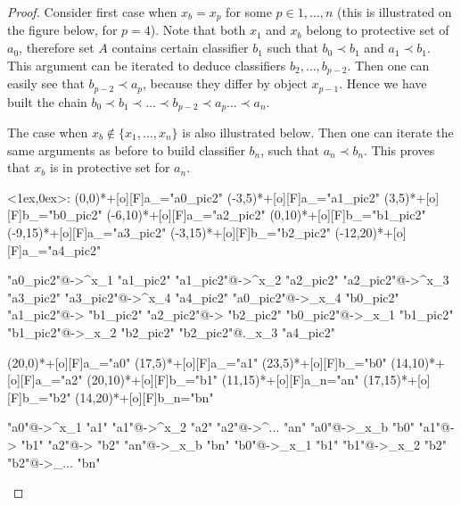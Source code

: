\documentclass{article}
\newenvironment{network}%
    {\begin{xy}<1ex,0ex>:}%
    {\end{xy}}
\def\nnNode[#1](#2)#3{\POS(#2)*#3="#1"}
\def\nnLink[#1,#2]#3{\POS"#1"\ar #3 "#2"}
\begin{document}
\begin{proof}
Consider first case when $x_b = x_p$ for some $p \in 1, \dots, n$ (this is illustrated on the figure below, for $p=4$).
Note that both $x_1$ and $x_b$ belong to protective set of $a_0$, therefore set $A$ contains certain classifier $b_1$ such that $b_0 \prec b_1$ and $a_1 \prec b_1$.
This argument can be iterated to deduce classifiers $b_2, \dots, b_{p-2}$. Then one can easily see that $b_{p-2} \prec a_p$, because they differ by object $x_{p-1}$.
Hence we have built the chain $b_0 \prec b_1 \prec \dots \prec b_{p-2} \prec a_p \dots \prec a_n$.

The case when $x_b \not\in \{x_1, \dots, x_n\}$ is also illustrated below. Then one can iterate the same arguments as before to build classifier $b_n$, such that $a_n \prec b_n$.
This proves that $x_b$ is in protective set for $a_n$.

\begin{center}
    \begin{network}
        \nnNode[a0_pic2](0,0)      {+[o][F]{a_{}}}
        \nnNode[a1_pic2](-3,5)     {+[o][F]{a_{}}}
        \nnNode[b0_pic2](3,5)      {+[o][F]{b_{}}}
        \nnNode[a2_pic2](-6,10)    {+[o][F]{a_{}}}
        \nnNode[b1_pic2](0,10)     {+[o][F]{b_{}}}
        \nnNode[a3_pic2](-9,15)    {+[o][F]{a_{}}}
        \nnNode[b2_pic2](-3,15)     {+[o][F]{b_{}}}
        \nnNode[a4_pic2](-12,20)    {+[o][F]{a_{}}}

        \nnLink[a0_pic2,a1_pic2] {@{->}^{x_1}}
        \nnLink[a1_pic2,a2_pic2] {@{->}^{x_2}}
        \nnLink[a2_pic2,a3_pic2] {@{->}^{x_3}}
        \nnLink[a3_pic2,a4_pic2] {@{->}^{x_4}}
        \nnLink[a0_pic2,b0_pic2] {@{->}_{x_4}}
        \nnLink[a1_pic2,b1_pic2] {@{->}}
        \nnLink[a2_pic2,b2_pic2] {@{->}}
        \nnLink[b0_pic2,b1_pic2] {@{->}_{x_1}}
        \nnLink[b1_pic2,b2_pic2] {@{->}_{x_2}}
        \nnLink[b2_pic2,a4_pic2] {@{.}_{x_3}}

        \nnNode[a0](20,0)      {+[o][F]{a_{}}}
        \nnNode[a1](17,5)     {+[o][F]{a_{}}}
        \nnNode[b0](23,5)      {+[o][F]{b_{}}}
        \nnNode[a2](14,10)    {+[o][F]{a_{}}}
        \nnNode[b1](20,10)     {+[o][F]{b_{}}}
        \nnNode[an](11,15)    {+[o][F]{a_{\scriptscriptstyle n}}}
        \nnNode[b2](17,15)    {+[o][F]{b_{}}}
        \nnNode[bn](14,20)    {+[o][F]{b_{\scriptscriptstyle n}}}

        \nnLink[a0,a1] {@{->}^{x_1}}
        \nnLink[a1,a2] {@{->}^{x_2}}
        \nnLink[a2,an] {@{->}^{...}}
        \nnLink[a0,b0] {@{->}_{x_b}}
        \nnLink[a1,b1] {@{->}}
        \nnLink[a2,b2] {@{->}}
        \nnLink[an,bn] {@{->}_{x_b}}
        \nnLink[b0,b1] {@{->}_{x_1}}
        \nnLink[b1,b2] {@{->}_{x_2}}
        \nnLink[b2,bn] {@{->}_{...}}
    \end{network}
\end{center}

\end{proof}
\end{document}
